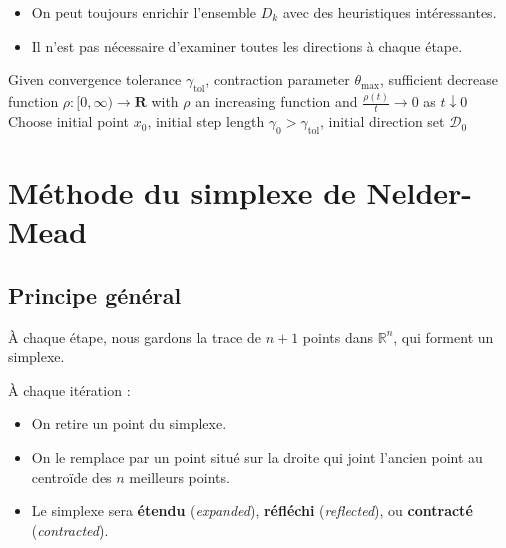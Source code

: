 \begin{remarque}
\begin{itemize}
    \item On peut toujours enrichir l'ensemble $D_k$ avec des heuristiques intéressantes.
    \item Il n'est pas nécessaire d'examiner toutes les directions à chaque étape.
\end{itemize}
\end{remarque}

\begin{algorithm}[H]
\caption{Méthode de recherche par motifs}
\label{alg:pattern-search}
Given convergence tolerance $\gamma_{\text{tol}}$, contraction parameter $\theta_{\max}$, sufficient decrease function $\rho : [0,\infty) \to \mathbf{R}$ with $\rho$ an increasing function and $\frac{\rho(t)}{t} \to 0$ as $t \downarrow 0$\;
Choose initial point $x_0$, initial step length $\gamma_0 > \gamma_{\text{tol}}$, initial direction set $\mathcal{D}_0$\;
\end{algorithm}

\section{Méthode du simplexe de Nelder-Mead}

\subsection{Principe général}

À chaque étape, nous gardons la trace de $n+1$ points dans $\mathbb{R}^n$, qui forment un simplexe.

À chaque itération :
\begin{itemize}
    \item On retire un point du simplexe.
    \item On le remplace par un point situé sur la droite qui joint l'ancien point au centroïde des $n$ meilleurs points.
    \item Le simplexe sera \textbf{étendu} (\textit{expanded}), \textbf{réfléchi} (\textit{reflected}), ou \textbf{contracté} (\textit{contracted}).
\end{itemize}

